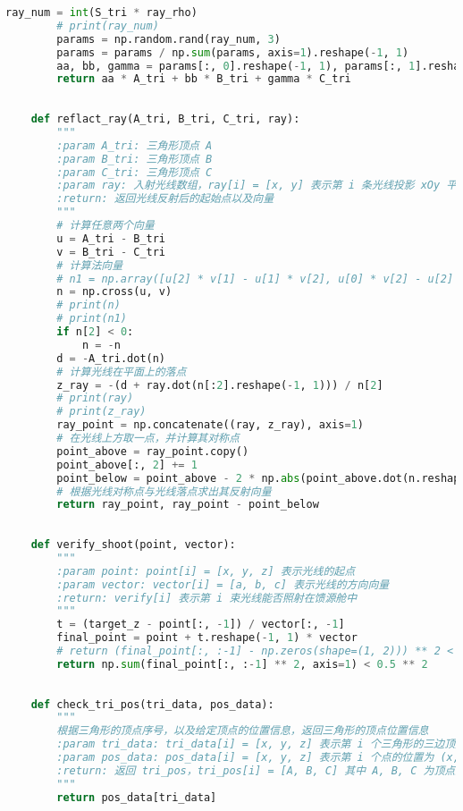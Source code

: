 \documentclass[withoutpreface,bwprint,fontset=macnew]{cumcmthesis} %
\begin{document}
\begin{appendices}
\begin{lstlisting}[language=python]
	    ray_num = int(S_tri * ray_rho)
	    # print(ray_num)
	    params = np.random.rand(ray_num, 3)
	    params = params / np.sum(params, axis=1).reshape(-1, 1)
	    aa, bb, gamma = params[:, 0].reshape(-1, 1), params[:, 1].reshape(-1, 1), params[:, 2].reshape(-1, 1)
	    return aa * A_tri + bb * B_tri + gamma * C_tri
	
	
	def reflact_ray(A_tri, B_tri, C_tri, ray):
	    """
	    :param A_tri: 三角形顶点 A
	    :param B_tri: 三角形顶点 B
	    :param C_tri: 三角形顶点 C
	    :param ray: 入射光线数组，ray[i] = [x, y] 表示第 i 条光线投影 xOy 平面坐标为 (x, y)
	    :return: 返回光线反射后的起始点以及向量
	    """
	    # 计算任意两个向量
	    u = A_tri - B_tri
	    v = B_tri - C_tri
	    # 计算法向量
	    # n1 = np.array([u[2] * v[1] - u[1] * v[2], u[0] * v[2] - u[2] * v[0], u[1] * v[0] - u[0] * v[1]])
	    n = np.cross(u, v)
	    # print(n)
	    # print(n1)
	    if n[2] < 0:
	        n = -n
	    d = -A_tri.dot(n)
	    # 计算光线在平面上的落点
	    z_ray = -(d + ray.dot(n[:2].reshape(-1, 1))) / n[2]
	    # print(ray)
	    # print(z_ray)
	    ray_point = np.concatenate((ray, z_ray), axis=1)
	    # 在光线上方取一点，并计算其对称点
	    point_above = ray_point.copy()
	    point_above[:, 2] += 1
	    point_below = point_above - 2 * np.abs(point_above.dot(n.reshape(-1, 1)) + d) / np.sum(n ** 2) * n
	    # 根据光线对称点与光线落点求出其反射向量
	    return ray_point, ray_point - point_below
	
	
	def verify_shoot(point, vector):
	    """
	    :param point: point[i] = [x, y, z] 表示光线的起点
	    :param vector: vector[i] = [a, b, c] 表示光线的方向向量
	    :return: verify[i] 表示第 i 束光线能否照射在馈源舱中
	    """
	    t = (target_z - point[:, -1]) / vector[:, -1]
	    final_point = point + t.reshape(-1, 1) * vector
	    # return (final_point[:, :-1] - np.zeros(shape=(1, 2))) ** 2 < 1
	    return np.sum(final_point[:, :-1] ** 2, axis=1) < 0.5 ** 2
	
	
	def check_tri_pos(tri_data, pos_data):
	    """
	    根据三角形的顶点序号，以及给定顶点的位置信息，返回三角形的顶点位置信息
	    :param tri_data: tri_data[i] = [x, y, z] 表示第 i 个三角形的三边顶点序号为 [x, y, z]
	    :param pos_data: pos_data[i] = [x, y, z] 表示第 i 个点的位置为 (x, y, z)
	    :return: 返回 tri_pos，tri_pos[i] = [A, B, C] 其中 A, B, C 为顶点坐标
	    """
	    return pos_data[tri_data]
	

\end{lstlisting}
\end{appendices}
\end{document}
